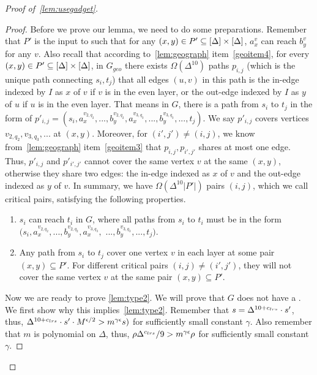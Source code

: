 \begin{proof}[Proof of~\cref{lem:usegadget}]
\begin{proof}
	Before we prove our lemma, we need to do some preparations. %
	Remember that $P'$ is the input to \gadget{\cs{}}{\epsilon} such that for any $(x,y)\in P'\subseteq[\Delta]\times[\Delta]$, $a^v_x$ can reach $b^v_y$ for any $v$. Also recall that according to~\cref{lem:geograph} item~\ref{geoitem4}, for every $(x,y)\in P'\subseteq [\Delta]\times[\Delta]$, in $G_{geo}$ there exists $\Omega(\Delta^{10})$ paths $p_{i,j}$ (which is the unique path connecting $s_i,t_j$) that all edges $(u,v)$ in this path is the in-edge indexed by $I$ as $x$ of $v$ if $v$ is in the even layer, or the out-edge indexed by $I$ as $y$ of $u$ if $u$ is in the even layer. That means in $G$, there is a path from $s_i$ to $t_j$ in the form of $p'_{i,j}=(s_i,a^{v_{2,q_2}}_{x},...,b^{v_{2,q_2}}_{y}, a^{v_{3,q_3}}_x,...,b^{v_{3,q_3}}_y,...,t_j)$. We say $p'_{i,j}$ covers vertices $v_{2,q_2},v_{3,q_3},...$ at $(x,y)$. Moreover, for $(i',j')\not=(i,j)$, we know from~\cref{lem:geograph} item~\ref{geoitem3} that $p_{i,j},p_{i',j'}$ shares at most one edge. Thus, $p'_{i,j}$ and $p'_{i',j'}$ cannot cover the same vertex $v$ at the same $(x,y)$, otherwise they share two edges: the in-edge indexed as $x$ of $v$ and the out-edge indexed as $y$ of $v$. In summary, we have $\Omega(\Delta^{10}|P'|)$ pairs $(i,j)$, which we call critical pairs, satisfying the following properties.
	\begin{enumerate}
		\item $s_i$ can reach $t_i$ in $G$, where all paths from $s_i$ to $t_i$ must be in the form $(s_i,a^{v_{2,q_2}}_{x},...,b^{v_{2,q_2}}_{y}, a^{v_{3,q_3}}_x,$ $...,b^{v_{3,q_3}}_y,...,t_j)$. 
		\item Any path from $s_i$ to $t_j$ cover one vertex $v$ in each layer at some pair $(x,y)\subseteq P'$. For different critical pairs $(i,j)\not=(i',j')$, they will not cover the same vertex $v$ at the same pair $(x,y)\subseteq P'$.
	\end{enumerate} 
	
	
	Now we are ready to prove \cref{lem:type2}. We will prove that $G$ does not have a . We first show why this implies~\cref{lem:type2}. Remember that $s=\Delta^{10+{c_{lrs}}}\cdot {s'}$, thus, $\Delta^{10+{c_{lrs}}}\cdot {s'}\cdot M^{\epsilon/2}>m^{\gamma\epsilon}s)$ for sufficiently small constant $\gamma$. Also remember that $m$ is polynomial on $\Delta$, thus, $\rho{}\Delta^{{c_{lrs}}{}}/9>m^{\gamma\epsilon}\rho{}$ for sufficiently small constant $\gamma$. 
	

\end{proof}
\end{proof}
